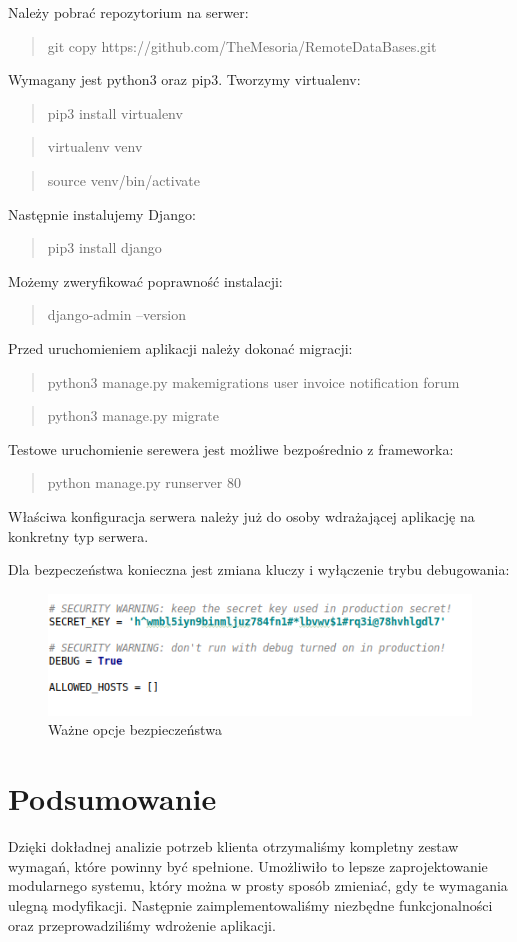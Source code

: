 \documentclass[12pt]{article}
\begin{document}
Należy pobrać repozytorium na serwer:
\begin{quote}
	git copy https://github.com/TheMesoria/RemoteDataBases.git
\end{quote}
Wymagany jest python3 oraz pip3. Tworzymy virtualenv:
\begin{quote}pip3 install virtualenv\end{quote}
\begin{quote}virtualenv venv\end{quote}
\begin{quote}source venv/bin/activate\end{quote}
Następnie instalujemy Django:
\begin{quote}pip3 install django\end{quote}
Możemy zweryfikować poprawność instalacji:
\begin{quote}django-admin --version\end{quote}
Przed uruchomieniem aplikacji należy dokonać migracji:
\begin{quote}python3 manage.py makemigrations user invoice notification forum\end{quote}
\begin{quote}python3 manage.py migrate\end{quote}
Testowe uruchomienie serewera jest możliwe bezpośrednio z frameworka:
\begin{quote}python manage.py runserver 80\end{quote}
Właściwa konfiguracja serwera należy już do osoby wdrażającej aplikację na konkretny typ serwera.

Dla bezpeczeństwa konieczna jest zmiana kluczy i wyłączenie trybu debugowania:
\begin{figure}[H]
	\centering
	\includegraphics[scale=0.7]{img/c_security.png}
	\caption{Ważne opcje bezpieczeństwa}
\end{figure}

\section{Podsumowanie}
Dzięki dokładnej analizie potrzeb klienta otrzymaliśmy kompletny zestaw wymagań, które powinny być spełnione. Umożliwiło to lepsze zaprojektowanie modularnego systemu, który można w prosty sposób zmieniać, gdy te wymagania ulegną modyfikacji. Następnie zaimplementowaliśmy niezbędne funkcjonalności oraz przeprowadziliśmy wdrożenie aplikacji.
\end{document}
